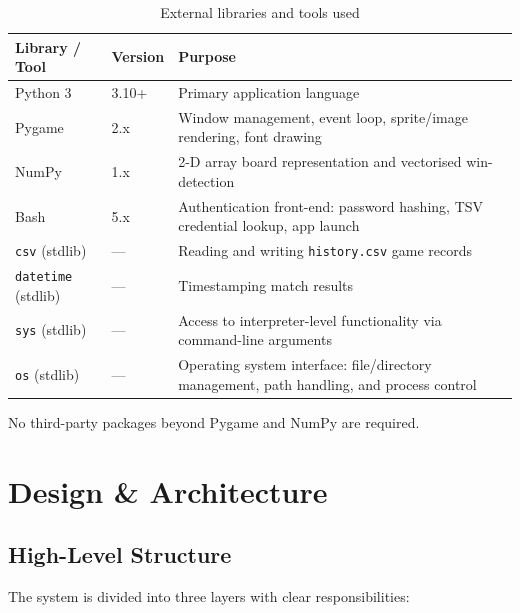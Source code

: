 \documentclass[12pt,a4paper]{article}
\begin{document}
\begin{table}[H]
\centering
\caption{External libraries and tools used}
\begin{tabular}{L{3cm} L{3cm} L{8cm}}
\toprule
\textbf{Library / Tool} & \textbf{Version} & \textbf{Purpose} \\
\midrule
Python 3  & 3.10+  & Primary application language \\
Pygame    & 2.x    & Window management, event loop, sprite/image rendering, font drawing \\
NumPy     & 1.x    & 2-D array board representation and vectorised win-detection \\
Bash      & 5.x    & Authentication front-end: password hashing, TSV credential lookup, app launch \\
\texttt{csv} (stdlib) & — & Reading and writing \texttt{history.csv} game records \\
\texttt{datetime} (stdlib) & — & Timestamping match results \\
\texttt{sys} (stdlib) & — & Access to interpreter-level functionality via command-line arguments\\
\texttt{os} (stdlib) & — & Operating system interface: file/directory management, path handling, and process control\\
\bottomrule
\end{tabular}
\end{table}

No third-party packages beyond Pygame and NumPy are required.

\section{Design \& Architecture}

\subsection{High-Level Structure}

The system is divided into three layers with clear responsibilities:
\end{document}
